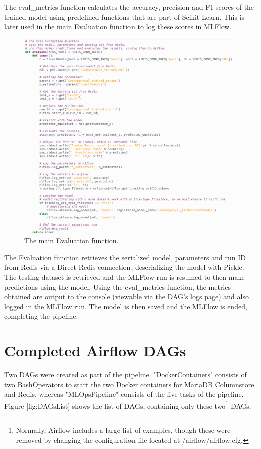 \documentclass[12pt]{report}
\newcommand{\para}{\vspace{7pt}\noindent}
\begin{document}
\para The eval\_metrics function calculates the accuracy, precision and F1 scores of the trained model 
using predefined functions that are part of Scikit-Learn. This is later used in the main Evaluation function 
to log these scores in MLFlow.

\begin{figure}[H]
    \centering
    \includegraphics[width=\linewidth]{Implementation/.Code/PipelineFunctions/Evaluation2.png}
    \caption{The main Evaluation function.}
    \label{fig:Evaluation2}
\end{figure}

\para The Evaluation function retrieves the serialized model, parameters and run ID from Redis 
via a Direct-Redis connection, deserializing the model with Pickle. The testing dataset is 
retrieved and the MLFlow run is resumed to then make predictions using the model. Using the 
eval\_metrics function, the metrics obtained are output to the console (viewable via the DAG's logs page)
and also logged in the MLFlow run. The model is then saved and the MLFlow is ended, completing the pipeline.

\section{Completed Airflow DAGs}
Two DAGs were created as part of the pipeline. "DockerContainers" consists of two BashOperators 
to start the two Docker containers for MariaDB Columnstore and Redis, whereas "MLOpsPipeline" 
consists of the five tasks of the pipeline. Figure \ref{fig:DAGsList} shows the list of DAGs, 
containing only these two\footnote{Normally, Airflow includes a large list of examples, though these were 
removed by changing the configuration file located at \texttildelow/airflow/airflow.cfg.} DAGs.
\end{document}
